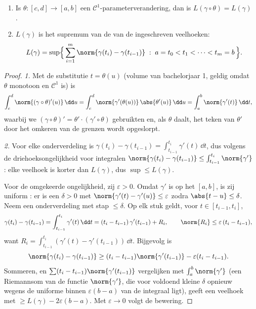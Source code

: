 \begin{theorem}\label{thm:b2:curves:lengthinv}
\leavevmode
\begin{enumerate}
\item Is $\theta \colon [c, d] \to [a, b]$ een
$\mathcal{C}^1$-parameterverandering, dan is $L(\gamma \circ
\theta) = L(\gamma)$.
\item $L(\gamma)$ is het supremum van de  van de
ingeschreven veelhoeken:
\[
L(\gamma)
= \sup\Bigl\{\, \sum_{i=1}^{m} \norm{\gamma(t_i) -
\gamma(t_{i-1})} \;:\; a = t_0 < t_1 < \dots < t_m = b \,\Bigr\}.
\]
\end{enumerate}
\end{theorem}

\begin{proof}
\emph{1.} Met de substitutie $t = \theta(u)$ (volume van
bachelorjaar 1, geldig omdat $\theta$ monotoon en $\mathcal{C}^1$
is) is
\[
\int_c^d \norm{(\gamma\circ\theta)'(u)}\,\dd u
= \int_c^d \norm{\gamma'(\theta(u))}\,\abs{\theta'(u)}\,\dd u
= \int_a^b \norm{\gamma'(t)}\,\dd t ,
\]
waarbij we $(\gamma\circ\theta)' = \theta'\cdot
(\gamma'\circ\theta)$ gebruikten en, als $\theta$ daalt, het teken
van $\theta'$ door het omkeren van de grenzen wordt opgeslorpt.

\emph{2.} Voor elke onderverdeling is $\gamma(t_i) - \gamma(t_{i-1})
= \int_{t_{i-1}}^{t_i}\gamma'(t)\,\dd t$, dus volgens de
driehoeksongelijkheid voor integralen $\norm{\gamma(t_i) -
\gamma(t_{i-1})} \leq \int_{t_{i-1}}^{t_i}\norm{\gamma'}$: elke
veelhoek is korter dan $L(\gamma)$, dus $\sup \leq L(\gamma)$.

Voor de omgekeerde ongelijkheid, zij $\varepsilon > 0$. Omdat
$\gamma'$  is op het  $[a,b]$, is zij uniform
: er is een $\delta > 0$ met $\norm{\gamma'(t) -
\gamma'(u)} \leq \varepsilon$ zodra $\abs{t - u} \leq \delta$. Neem
een onderverdeling met stap $\leq \delta$. Op elk stuk geldt, voor
$t \in [t_{i-1}, t_i]$,
\[
\gamma(t_i) - \gamma(t_{i-1})
= \int_{t_{i-1}}^{t_i}\gamma'(t)\,\dd t
= (t_i - t_{i-1})\,\gamma'(t_{i-1}) + R_i,
\qquad
\norm{R_i} \leq \varepsilon\,(t_i - t_{i-1}),
\]
want $R_i = \int_{t_{i-1}}^{t_i}(\gamma'(t) -
\gamma'(t_{i-1}))\,\dd t$. Bijgevolg is
\[
\norm{\gamma(t_i) - \gamma(t_{i-1})}
\geq (t_i - t_{i-1})\norm{\gamma'(t_{i-1})}
- \varepsilon (t_i - t_{i-1}) .
\]
Sommeren, en $\sum (t_i - t_{i-1})\norm{\gamma'(t_{i-1})}$
vergelijken met $\int_a^b\norm{\gamma'}$ (een Riemannsom van de
 functie $\norm{\gamma'}$, die voor voldoend kleine
$\delta$ opnieuw wegens de uniforme  binnen
$\varepsilon(b - a)$ van de integraal ligt), geeft een veelhoek met
 $\geq L(\gamma) - 2\varepsilon(b - a)$. Met $\varepsilon \to
0$ volgt de bewering.
\end{proof}

